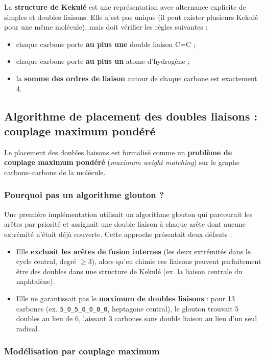 \documentclass[a4paper,12pt]{article}
\begin{document}
La \textbf{structure de Kekulé} est une représentation avec alternance explicite de simples et
doubles liaisons. Elle n'est pas unique (il peut exister plusieurs Kekulé pour une même molécule),
mais doit vérifier les règles suivantes :
\begin{itemize}
  \item chaque carbone porte \textbf{au plus une} double liaison C=C ;
  \item chaque carbone porte \textbf{au plus un} atome d'hydrogène ;
  \item la \textbf{somme des ordres de liaison} autour de chaque carbone est exactement 4.
\end{itemize}

\subsection{Algorithme de placement des doubles liaisons : couplage maximum pondéré}

Le placement des doubles liaisons est formalisé comme un \textbf{problème de couplage maximum
pondéré} (\textit{maximum weight matching}) sur le graphe carbone--carbone de la molécule.

\subsubsection{Pourquoi pas un algorithme glouton ?}

Une première implémentation utilisait un algorithme glouton qui parcourait les arêtes par
priorité et assignait une double liaison à chaque arête dont aucune extrémité n'était déjà
couverte. Cette approche présentait deux défauts :

\begin{itemize}
  \item Elle \textbf{excluait les arêtes de fusion internes} (les deux extrémités dans le
    cycle central, degré $\geq 3$), alors qu'en chimie ces liaisons peuvent parfaitement être
    des doubles dans une structure de Kekulé (ex. la liaison centrale du naphtalène).
  \item Elle ne garantissait pas le \textbf{maximum de doubles liaisons} : pour 13 carbones
    (ex. \texttt{5\_0\_5\_0\_0\_0\_0}, heptagone central), le glouton trouvait 5 doubles au lieu
    de 6, laissant 3 carbones sans double liaison au lieu d'un seul radical.
\end{itemize}

\subsubsection{Modélisation par couplage maximum}
\end{document}
